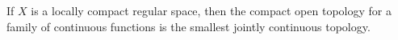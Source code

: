 If $X$ is a locally compact regular space, then the compact open topology for a family of continuous functions is the smallest jointly continuous topology.
